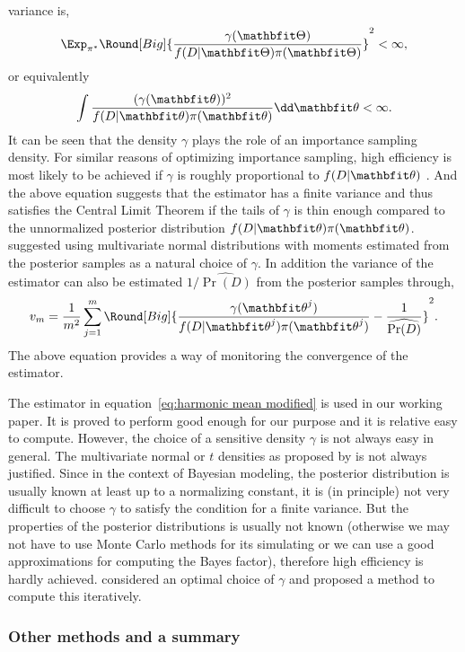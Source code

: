 variance is,
\begin{equation}
  \Exp_{\pi^*}\Round[Big]{
    \frac{\gamma(\bTh)}{f(D|\bTh)\pi(\bTh)}}^2 < \infty,
\end{equation}
or equivalently
\begin{equation}
  \int \frac{(\gamma(\bth))^2}{f(D|\bth)\pi(\bth)}\dd\bth < \infty.
\end{equation}
It can be seen that the density $\gamma$ plays the role of an importance
sampling density. For similar reasons of optimizing importance sampling, high
efficiency is most likely to be achieved if $\gamma$ is roughly proportional
to $f(D|\bth)$ \parencite{Kass1995}. And the above equation suggests that the
estimator has a finite variance and thus satisfies the Central Limit Theorem
if the tails of $\gamma$ is thin enough compared to the unnormalized posterior
distribution $f(D|\bth)\pi(\bth)$. \textcite{Gelfand1994} suggested using
multivariate normal distributions with moments estimated from the posterior
samples as a natural choice of $\gamma$. In addition the variance of the
estimator can also be estimated $1/\widehat{\Pr(D)}$ from the posterior
samples through,
\begin{equation}
  v_m = \frac{1}{m^2}\sum_{j=1}^m \Round[Big]{
    \frac{\gamma(\bth^j)}{f(D|\bth^j)\pi(\bth^j)}
    - \frac{1}{\widehat{\Pr(D)}}}^2.
\end{equation}
The above equation provides a way of monitoring the convergence of the
estimator.

The estimator in equation~\eqref{eq:harmonic mean modified} is used in our
working paper. It is proved to perform good enough for our purpose and it is
relative easy to compute. However, the choice of a sensitive density $\gamma$
is not always easy in general. The multivariate normal or $t$ densities as
proposed by \textcite{Gelfand1994} is not always justified. Since in the
context of Bayesian modeling, the posterior distribution is usually known at
least up to a normalizing constant, it is (in principle) not very difficult to
choose $\gamma$ to satisfy the condition for a finite variance. But the
properties of the posterior distributions is usually not known (otherwise we
may not have to use Monte Carlo methods for its simulating or we can use a
good approximations for computing the Bayes factor), therefore high efficiency
is hardly achieved. \textcite{Meng1996} considered an optimal choice of
$\gamma$ and proposed a method to compute this iteratively.

\subsubsection{Other methods and a summary}
\label{ssub:Other methods and a summary a}

